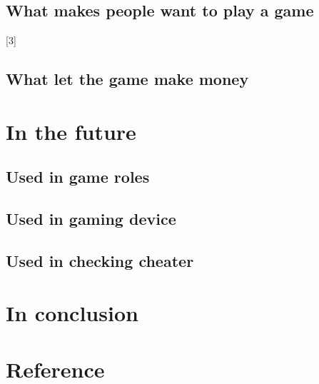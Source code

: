 \documentclass[12pt]{article}
\begin{document}
        \subsection{What makes people want to play a game}
            [3]
        \subsection{What let the game make money}
    \section{In the future}
        \subsection{Used in game roles}
        \subsection{Used in gaming device}
        \subsection{Used in checking cheater}
    \section{In conclusion}
    \pagebreak
    \section{Reference}
\end{document}
